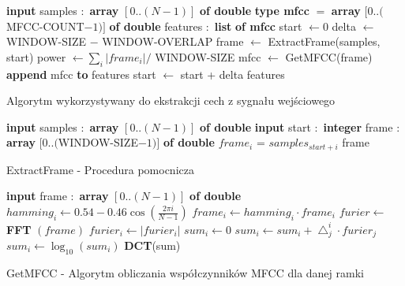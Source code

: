 \documentclass[a4paper]{article}
\begin{document}
		\begin{algorithm}[h]
			\begin{algorithmic}[1]
				\STATE \textbf{input} samples $:$ \textbf{array} $[0 .. (N-1)]$ \textbf{of double}
				\STATE
				\STATE {}
				\STATE \textbf{type mfcc} $=$ \textbf{array} $[0 .. ($MFCC-COUNT$-1)]$ \textbf{of double}
				\STATE features	$:$ \textbf{list} \textbf{of mfcc}			
				\STATE start $\leftarrow 0$
				\STATE delta $\leftarrow$ WINDOW-SIZE $-$ WINDOW-OVERLAP
				\STATE
					\STATE frame $\leftarrow$ ExtractFrame(samples, start)
					\STATE power $\leftarrow \sum_i |frame_i| /$ WINDOW-SIZE
						\STATE mfcc $\leftarrow$ GetMFCC(frame)
						\STATE \textbf{append} mfcc \textbf{to} features
					\ENDIF					
					\STATE start $\leftarrow$ start + delta
				\ENDWHILE
				\STATE
				\RETURN features
			\end{algorithmic}			
			\caption{Algorytm wykorzystywany do ekstrakcji cech z sygnału wejściowego}
			\label{alg:ftextract}
		\end{algorithm}	
		\begin{algorithm}[h]
			\begin{algorithmic}[1]
				\STATE \textbf{input} samples $:$ \textbf{array} $[0 .. (N-1)]$ \textbf{of double}
				\STATE \textbf{input} start $:$ \textbf{integer}
				\STATE
				\STATE frame $:$ \textbf{array} $[0 .. ($WINDOW-SIZE$-1)]$ \textbf{of double}
					\STATE $frame_i$ = $samples_{start+i}$
				\ENDFOR
				\STATE
				\RETURN frame
			\end{algorithmic}			
			\caption{ExtractFrame - Procedura pomocnicza}
			\label{alg:extractframe}
		\end{algorithm}	
		\begin{algorithm}[h]
			\begin{algorithmic}[1]
				\STATE \textbf{input} frame $:$ \textbf{array} $[0 .. (N-1)]$ \textbf{of double}
				\STATE
					\STATE $hamming_i \leftarrow 0.54 - 0.46 \cos(\frac{2\pi i}{N - 1})$
					\STATE $frame_i \leftarrow hamming_i \cdot frame_i$
				\ENDFOR
				\STATE
				\STATE $furier \leftarrow$ \textbf{FFT} $(frame)$
					\STATE $furier_i \leftarrow |furier_i|$
				\ENDFOR
				\STATE
					\STATE $sum_i \leftarrow 0$
						\STATE $sum_i \leftarrow sum_i + \bigtriangleup_j^i \cdot furier_j$					
					\ENDFOR
					\STATE $sum_i \leftarrow \log_{10}(sum_i)$
				\ENDFOR
				\STATE
				\STATE {}
				\RETURN \textbf{DCT}(sum)
			\end{algorithmic}			
			\caption{GetMFCC - Algorytm obliczania współczynników MFCC dla danej ramki}
			\label{alg:getmfcc}
		\end{algorithm}	
\end{document}
